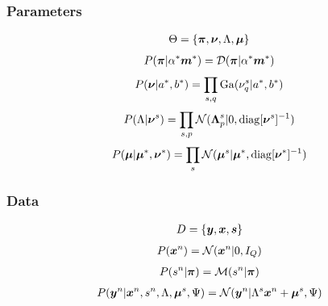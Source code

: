 \documentclass[a4paper]{article}
\begin{document}
\subsubsection{Parameters}
\begin{align}
  \Theta=\left\{\bs{\pi},\bs{\nu},\Lambda,\bs{\mu}\right\}
\end{align}
\begin{align}
  P(\Xp|\Xhal\Xhm)=\Xdd(\Xp|\Xhal\Xhm)
\end{align}
\begin{align}
  P(\bs{\nu}|\Xha,\Xhb)=\prod_{s,q}\Xdg(\Xnq|\Xha,\Xhb)
\end{align}
\begin{align}
  P(\Lambda|\Xn)=\prod_{s,p}\Xdn(\Xlp|0,\Xdiag[\Xn]^{-1})
\end{align}
\begin{align}
  P(\bs{\mu}|\Xhu,\Xhn)=\prod_s\Xdn(\Xu|\Xhu,\Xdiag[\Xhn]^{-1})
\end{align}
\subsubsection{Data}
\begin{align}
  D=\left\{\bs{y},\bs{x},\bs{s}\right\}
\end{align}
\begin{align}
  P(\Xx)=\Xdn(\Xx|0,I_{Q})
\end{align}
\begin{align}
  P(\Xs|\Xp)=\Xdm(\Xs|\Xp)
\end{align}
\begin{align}
  P(\Xy|\Xx,\Xs,\Lambda,\Xu,\Xpsi)=\Xdn(\Xy|\Xl\Xx+\Xu,\Xpsi)
\end{align}
\end{document}
